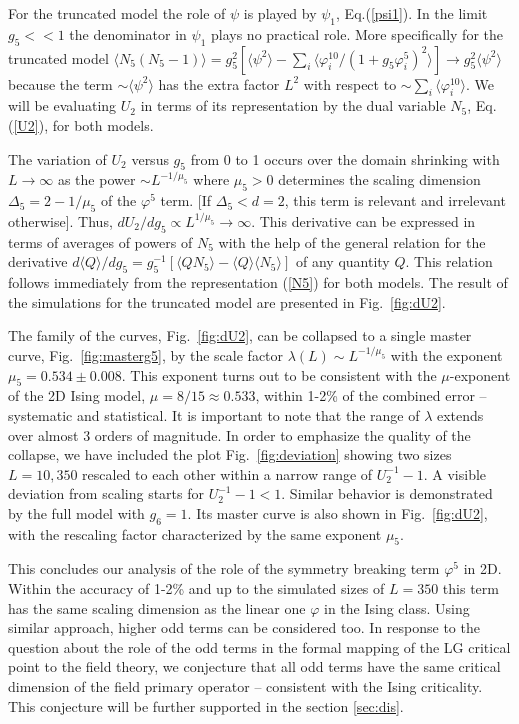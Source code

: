 \documentclass[prb,aps,twocolumn,groupedaddress,floats,showpacs,final]{revtex4}
\begin{document}
For the truncated model the role of $\psi$ is played by $\psi_1$, Eq.(\ref{psi1}). In the limit $g_5 <<1$ the denominator in $\psi_1$ plays no practical role.
More specifically for the truncated model  $\langle N_5(N_5-1) \rangle =g_5^2 [\langle \psi ^2\rangle - \sum_i \langle \varphi_i^{10}/(1+g_5 \varphi^5_i)^2\rangle] \to g_5^2 \langle \psi ^2\rangle$ because the term $\sim \langle \psi ^2\rangle$ has the extra factor $L^2$ with respect to $\sim \sum_i \langle \varphi_i^{10}\rangle $.
 We will be evaluating $U_2$ in terms of its representation by the dual variable $N_5$, Eq.(\ref{U2}), for both models.  





 The variation of $U_2$ versus $g_5$ from 0 to 1 occurs over the domain shrinking with $L \to \infty$ as the power $\sim L^{-1/\mu_5}$ where $\mu_5>0$ determines the scaling dimension $\Delta_5 = 2-1/\mu_5$ of the $\varphi^5$ term. 
[If $\Delta_5 <d=2$, this term is relevant and irrelevant otherwise].
Thus, $dU_2/dg_5 \propto L^{1/\mu_5} \to \infty$.
This derivative can be expressed in terms of averages of powers of $N_5$ with the help of the general relation for the derivative  $d \langle Q\rangle /dg_5 =g_5^{-1} [\langle Q N_5\rangle - \langle Q\rangle \langle N_5\rangle]$ of any quantity $Q$. This relation follows immediately from the representation (\ref{N5}) for both models. The result of the simulations for the truncated model are presented in Fig.~\ref{fig:dU2}.

The family of  the curves, Fig.~\ref{fig:dU2}, can be collapsed to a single master curve, Fig.~\ref{fig:masterg5},  by the scale factor $\lambda(L) \sim L^{-1/\mu_5}$ with
the exponent $\mu_5 = 0.534 \pm 0.008$. This exponent turns out to be consistent with the $\mu$-exponent of the 2D Ising model, $\mu=8/15\approx 0.533$, within 1-2\%
of the combined error -- systematic and statistical.  It is important to note that the range of $\lambda$ extends over almost 3 orders of magnitude.  In order to emphasize the quality of the collapse, we have included the plot Fig.~\ref{fig:deviation} showing two sizes $L=10,350$ rescaled to each other within a narrow range of $U^{-1}_2-1$. A visible deviation from scaling starts for $U^{-1}_2 -1 < 1$.  Similar behavior is demonstrated by the full model with $g_6=1$. Its master curve is also shown in Fig.~\ref{fig:dU2}, with the rescaling factor  characterized by the same exponent $\mu_5$. 

This concludes our analysis of the role of the symmetry breaking term $\varphi^5$ in 2D. Within the accuracy of 1-2\% and up to the simulated sizes of $L=350$ this term has the same scaling dimension as the linear one $\varphi$ in the Ising class. Using similar approach, higher odd terms can  be considered too. In response to the question \cite{SMA} about the role of the odd terms in the formal mapping \cite{Hubbard} of the LG critical point to the field theory, we conjecture that all odd terms have the same critical dimension of the field primary operator -- consistent with the Ising criticality.  This conjecture will be further supported in the section \ref{sec:dis}.
\end{document}

